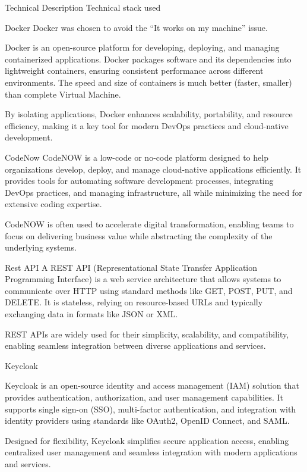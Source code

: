 \chap Technical Description
\sec Technical stack used

\secc Docker
Docker was chosen to avoid the ``It works on my machine'' issue.

Docker is an open-source platform for developing, deploying, and managing containerized applications. Docker packages software and its dependencies into lightweight containers, ensuring consistent performance across different environments. The speed and size of containers is much better (faster, smaller) than complete Virtual Machine.

By isolating applications, Docker enhances scalability, portability, and resource efficiency, making it a key tool for modern DevOps practices and cloud-native development.

\secc CodeNow
CodeNOW is a low-code or no-code platform designed to help organizations develop, deploy, and manage cloud-native applications efficiently. It provides tools for automating software development processes, integrating DevOps practices, and managing infrastructure, all while minimizing the need for extensive coding expertise.

CodeNOW is often used to accelerate digital transformation, enabling teams to focus on delivering business value while abstracting the complexity of the underlying systems.

\secc Rest API
A REST API (Representational State Transfer Application Programming Interface) is a web service architecture that allows systems to communicate over HTTP using standard methods like GET, POST, PUT, and DELETE. It is stateless, relying on resource-based URLs and typically exchanging data in formats like JSON or XML.

REST APIs are widely used for their simplicity, scalability, and compatibility, enabling seamless integration between diverse applications and services.

\secc Keycloak

Keycloak is an open-source identity and access management (IAM) solution that provides authentication, authorization, and user management capabilities. It supports single sign-on (SSO), multi-factor authentication, and integration with identity providers using standards like OAuth2, OpenID Connect, and SAML.

Designed for flexibility, Keycloak simplifies secure application access, enabling centralized user management and seamless integration with modern applications and services.

